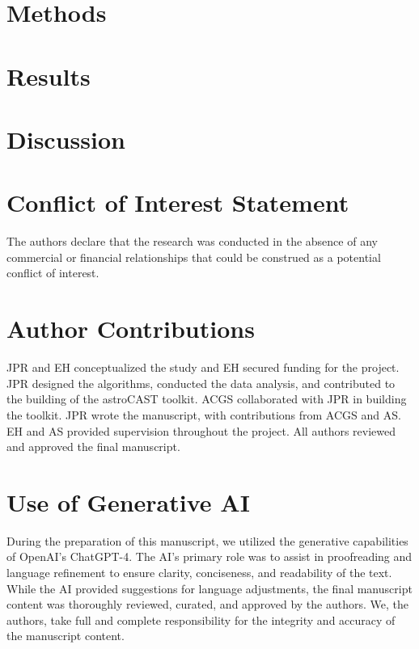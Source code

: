 \documentclass[utf8]{FrontiersinHarvard}
\begin{document}
    \section{Methods}
    


    \section{Results}
    

    
    
    
    


    \section{Discussion}
    

    \section*{Conflict of Interest Statement}
    The authors declare that the research was conducted in the absence of any commercial or financial relationships that could be construed as a potential conflict of interest.

    \section*{Author Contributions}
    JPR and EH conceptualized the study and EH secured funding for the project. JPR designed the algorithms, conducted the data analysis, and contributed to the building of the astroCAST toolkit. ACGS collaborated with JPR in building the toolkit. JPR wrote the manuscript, with contributions from ACGS and AS. EH and AS provided supervision throughout the project. All authors reviewed and approved the final manuscript.

    \section*{Use of Generative AI}
    During the preparation of this manuscript, we utilized the generative capabilities of OpenAI's ChatGPT-4. The AI's primary role was to assist in proofreading and language refinement to ensure clarity, conciseness, and readability of the text. While the AI provided suggestions for language adjustments, the final manuscript content was thoroughly reviewed, curated, and approved by the authors. We, the authors, take full and complete responsibility for the integrity and accuracy of the manuscript content.
\end{document}
